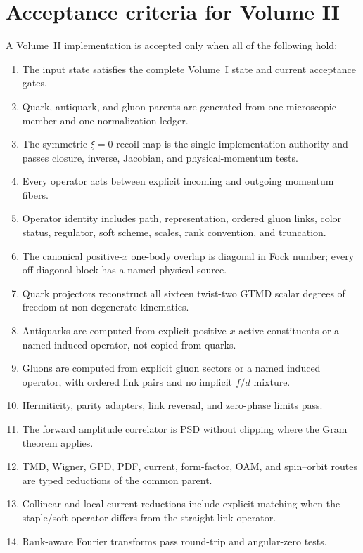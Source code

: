 \documentclass[11pt]{article}
\begin{document}
\section{Acceptance criteria for Volume II}
\label{sec:acceptance}

A Volume~II implementation is accepted only when all of the following hold:
\begin{enumerate}
\item The input state satisfies the complete Volume~I state and current
      acceptance gates.
\item Quark, antiquark, and gluon parents are generated from one microscopic
      member and one normalization ledger.
\item The symmetric \(\xi=0\) recoil map is the single implementation
      authority and passes closure, inverse, Jacobian, and physical-momentum
      tests.
\item Every operator acts between explicit incoming and outgoing momentum
      fibers.
\item Operator identity includes path, representation, ordered gluon links,
      color status, regulator, soft scheme, scales, rank convention, and
      truncation.
\item The canonical positive-\(x\) one-body overlap is diagonal in Fock number;
      every off-diagonal block has a named physical source.
\item Quark projectors reconstruct all sixteen twist-two GTMD scalar degrees
      of freedom at non-degenerate kinematics.
\item Antiquarks are computed from explicit positive-\(x\) active constituents
      or a named induced operator, not copied from quarks.
\item Gluons are computed from explicit gluon sectors or a named induced
      operator, with ordered link pairs and no implicit \(f/d\) mixture.
\item Hermiticity, parity adapters, link reversal, and zero-phase limits pass.
\item The forward amplitude correlator is PSD without clipping where the Gram
      theorem applies.
\item TMD, Wigner, GPD, PDF, current, form-factor, OAM, and spin--orbit routes
      are typed reductions of the common parent.
\item Collinear and local-current reductions include explicit matching when
      the staple/soft operator differs from the straight-link operator.
\item Rank-aware Fourier transforms pass round-trip and angular-zero tests.

\end{enumerate}
\end{document}
